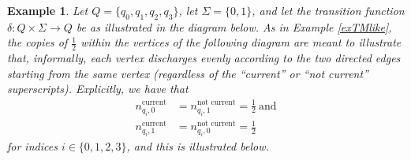 \documentclass[12pt]{article}
\newtheorem{example}{Example}
\begin{document}
\begin{example}\label{extuplecharge}
 Let $Q = \{ q_0, q_1, q_2, q_3 \}$, let $\Sigma = \{ 0, 1 \}$, 
 and let the transition function $\delta\colon Q \times \Sigma \to Q$ be as illustrated in the diagram below. 
 As in Example \ref{exTMlike}, 
 the copies of $\frac{1}{2}$ within the vertices of the following diagram are meant to illustrate that, informally, 
 each vertex discharges evenly according to the two directed edges starting from the same vertex (regardless of the ``current''
 or ``not current'' superscripts). 
 Explicitly, we have that 
\begin{align*}
 n_{q_{i}, 0}^{\text{current}} & = n_{q_{i}, 1}^{\text{not current}} = \frac{1}{2} \ \text{and} \\
 n_{q_{i}, 1}^{\text{current}} & = n_{q_{i}, 0}^{\text{not current}} = \frac{1}{2} 
\end{align*} 
 for indices $i \in \{ 0, 1, 2, 3 \}$, 
 and this is illustrated below. 
\begin{center}
\end{center}
\end{example}
\end{document}
